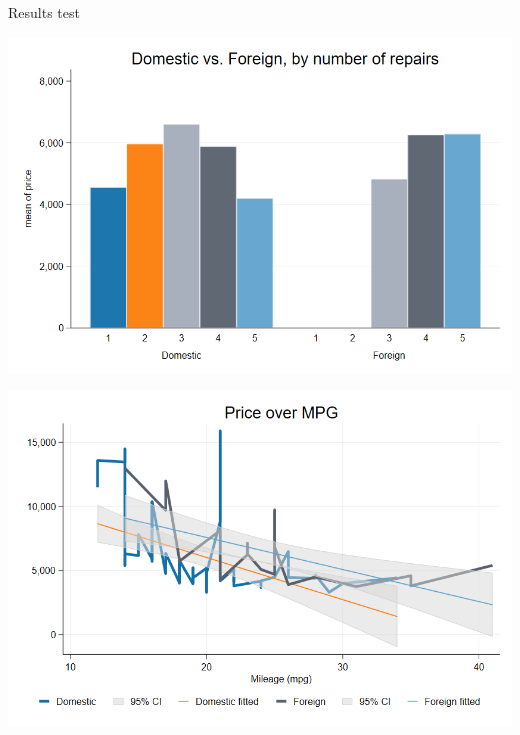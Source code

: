 \documentclass[../main.tex]{subfiles} %
\begin{document}
Results test








\includegraphics[width=1\textwidth]{project/figures/graph_repair_prices.png} %

\includegraphics[width=1\textwidth]{project/figures/graph_twoway.png} %
\end{document}
